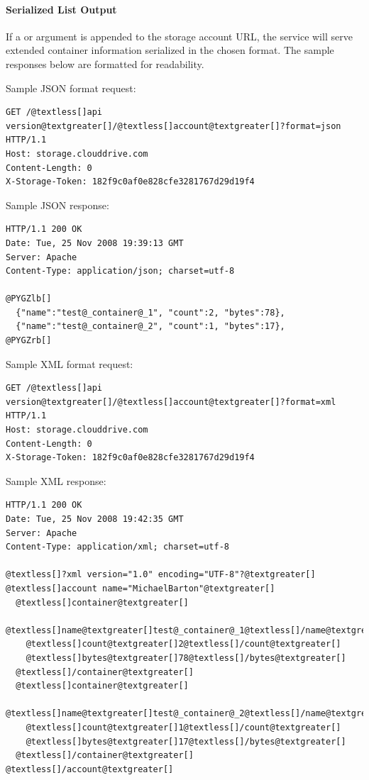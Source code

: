 \documentclass[letterpaper,10pt,english]{manual}
\begin{document}
\paragraph{Serialized List Output}

If a  or  argument is appended to the storage
account URL, the service will serve extended container information
serialized in the chosen format.  The sample responses below are formatted
for readability.

Sample JSON format request:

\begin{Verbatim}[commandchars=@\[\]]
GET /@textless[]api version@textgreater[]/@textless[]account@textgreater[]?format=json HTTP/1.1
Host: storage.clouddrive.com
Content-Length: 0
X-Storage-Token: 182f9c0af0e828cfe3281767d29d19f4
\end{Verbatim}

Sample JSON response:

\begin{Verbatim}[commandchars=@\[\]]
HTTP/1.1 200 OK
Date: Tue, 25 Nov 2008 19:39:13 GMT
Server: Apache
Content-Type: application/json; charset=utf-8

@PYGZlb[]
  {"name":"test@_container@_1", "count":2, "bytes":78},
  {"name":"test@_container@_2", "count":1, "bytes":17},
@PYGZrb[]
\end{Verbatim}

Sample XML format request:

\begin{Verbatim}[commandchars=@\[\]]
GET /@textless[]api version@textgreater[]/@textless[]account@textgreater[]?format=xml HTTP/1.1
Host: storage.clouddrive.com
Content-Length: 0
X-Storage-Token: 182f9c0af0e828cfe3281767d29d19f4
\end{Verbatim}

Sample XML response:

\begin{Verbatim}[commandchars=@\[\]]
HTTP/1.1 200 OK
Date: Tue, 25 Nov 2008 19:42:35 GMT
Server: Apache
Content-Type: application/xml; charset=utf-8

@textless[]?xml version="1.0" encoding="UTF-8"?@textgreater[]
@textless[]account name="MichaelBarton"@textgreater[]
  @textless[]container@textgreater[]
    @textless[]name@textgreater[]test@_container@_1@textless[]/name@textgreater[]
    @textless[]count@textgreater[]2@textless[]/count@textgreater[]
    @textless[]bytes@textgreater[]78@textless[]/bytes@textgreater[]
  @textless[]/container@textgreater[]
  @textless[]container@textgreater[]
    @textless[]name@textgreater[]test@_container@_2@textless[]/name@textgreater[]
    @textless[]count@textgreater[]1@textless[]/count@textgreater[]
    @textless[]bytes@textgreater[]17@textless[]/bytes@textgreater[]
  @textless[]/container@textgreater[]
@textless[]/account@textgreater[]
\end{Verbatim}
\end{document}
